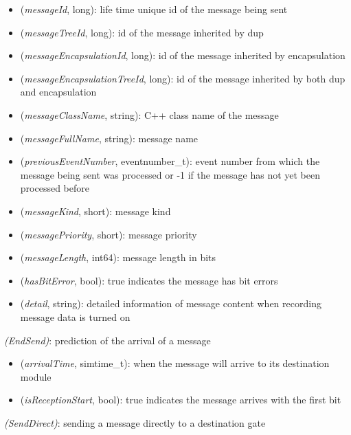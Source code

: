 \begin{itemize}
  \item {} (\textit{messageId}, long): life time unique id of the message being sent
  \item {} (\textit{messageTreeId}, long): id of the message inherited by dup
  \item {} (\textit{messageEncapsulationId}, long): id of the message inherited by encapsulation
  \item {} (\textit{messageEncapsulationTreeId}, long): id of the message inherited by both dup and encapsulation
  \item {} (\textit{messageClassName}, string): C++ class name of the message
  \item {} (\textit{messageFullName}, string): message name
  \item {} (\textit{previousEventNumber}, eventnumber\_t): event number from which the message being sent was processed or -1 if the message has not yet been processed before
  \item {} (\textit{messageKind}, short): message kind
  \item {} (\textit{messagePriority}, short): message priority
  \item {} (\textit{messageLength}, int64): message length in bits
  \item {} (\textit{hasBitError}, bool): true indicates the message has bit errors
  \item {} (\textit{detail}, string): detailed information of message content when recording message data is turned on
\end{itemize}

 \textit{(EndSend)}: prediction of the arrival of a message

\begin{itemize}
  \item {} (\textit{arrivalTime}, simtime\_t): when the message will arrive to its destination module
  \item {} (\textit{isReceptionStart}, bool): true indicates the message arrives with the first bit
\end{itemize}

 \textit{(SendDirect)}: sending a message directly to a destination gate

